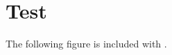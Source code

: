 \documentclass[../main]{subfiles}
\begin{document}
\chapter{Test}

The following figure is included with \verb||.


\end{document}
